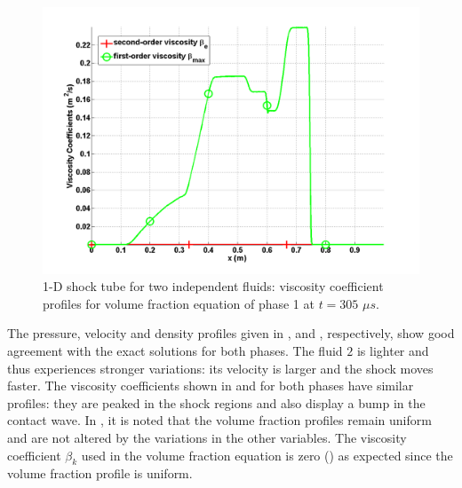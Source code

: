 \begin{figure}[H]
\centering
\includegraphics[width=\textwidth]{figures/SEM/two_phases_liquid_beta.png}
\caption{1-D shock tube for two independent fluids: viscosity coefficient profiles for volume fraction equation of phase 1 at $t=305$ $\mu s$.}
\label{fig:two-indep-fluids-vf-visc-1-7-eqn-sect4}
\end{figure}
%
\newpage
The pressure, velocity and density profiles given in ,  and , respectively, show good agreement with the exact solutions for both phases. The fluid $2$ is lighter and thus experiences stronger variations: its velocity is larger and the shock moves faster. The viscosity coefficients shown in  and  for both phases have similar profiles: they are peaked in the shock regions and also display a bump in the contact wave. In , it is noted that the volume fraction profiles remain uniform and are not altered by the variations in the other variables. The viscosity coefficient $\beta_k$ used in the volume fraction equation is zero () as expected since the volume fraction profile is uniform.
